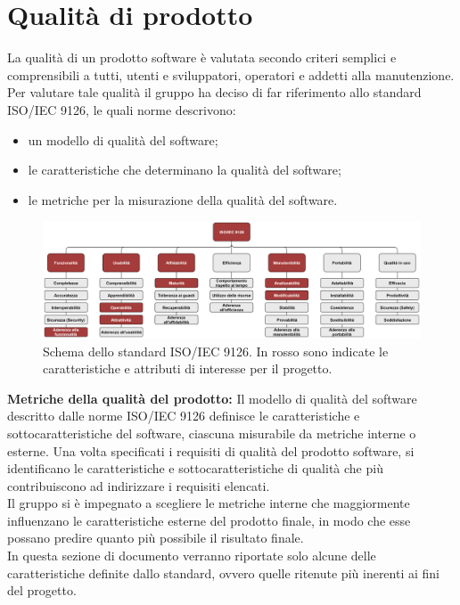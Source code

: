 \section{Qualità di prodotto}
La qualità di un prodotto software è valutata secondo criteri semplici e comprensibili a tutti, utenti e sviluppatori, operatori e addetti alla manutenzione.
Per valutare tale qualità il gruppo \Gruppo ha deciso di far riferimento allo standard ISO/IEC 9126, le quali norme descrivono:
\begin{itemize}
\item un modello di qualità del software; 
\item le caratteristiche che determinano la qualità del software;
\item le metriche per la misurazione della qualità del software.
\end{itemize}

\begin{figure}[h]
    \centering
    \includegraphics[scale=0.53]{sezioni/Immagini/Iso_Iec_9126.png}
    \caption{Schema dello standard ISO/IEC 9126. In rosso sono indicate le caratteristiche e attributi di interesse per il progetto.}
\end{figure}

\textbf{Metriche della qualità del prodotto:}
Il modello di qualità del software descritto dalle norme ISO/IEC 9126 definisce le caratteristiche e sottocaratteristiche del software, ciascuna misurabile da metriche interne o esterne.
Una volta specificati i requisiti di qualità del prodotto software, si identificano le caratteristiche e sottocaratteristiche di qualità che più contribuiscono ad indirizzare i requisiti elencati.\\
Il gruppo \Gruppo si è impegnato a scegliere le metriche interne che maggiormente influenzano le caratteristiche esterne del prodotto finale, in modo che esse possano predire quanto più possibile il risultato finale.\\
In questa sezione di documento verranno riportate solo alcune delle caratteristiche definite dallo standard, ovvero quelle ritenute più inerenti ai fini del progetto.

